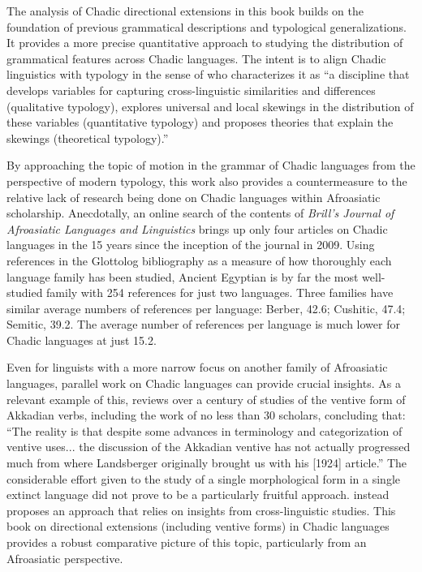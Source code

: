 The analysis of Chadic directional extensions in this book builds on the foundation of previous grammatical descriptions and typological generalizations. It provides a more precise quantitative approach to studying the distribution of grammatical features across Chadic languages. The intent is to align Chadic linguistics with typology in the sense of \citet[6]{bickelTypology21stCentury2007} who characterizes it as ``a discipline that develops variables for capturing cross-linguistic similarities and differences (qualitative typology), explores universal and local skewings in the distribution of these variables (quantitative typology) and proposes theories that explain the skewings (theoretical typology).''

By approaching the topic of motion in the grammar of Chadic languages from the perspective of modern typology, this work also provides a countermeasure to the relative lack of research being done on Chadic languages within Afroasiatic scholarship. Anecdotally, an online search of the contents of \textit{Brill's Journal of Afroasiatic Languages and Linguistics} brings up only four articles on Chadic languages in the 15 years since the inception of the journal in 2009. Using references in the Glottolog bibliography \citep{hammarstromGlottolog502024} as a measure of how thoroughly each language family has been studied, Ancient Egyptian is by far the most well-studied family with 254 references for just two languages. Three families have similar average numbers of references per language: Berber, 42.6; Cushitic, 47.4; Semitic, 39.2. The average number of references per language is much lower for Chadic languages at just 15.2.

Even for linguists with a more narrow focus on another family of Afroasiatic languages, parallel work on Chadic languages can provide crucial insights. As a relevant example of this, \citet[133]{fixSemanticsSemiticVentive2020} reviews over a century of studies of the ventive form of Akkadian verbs, including the work of no less than 30 scholars, concluding that: ``The reality is that despite some advances in terminology and categorization of ventive uses... the discussion of the Akkadian ventive has not actually progressed much from where Landsberger originally brought us with his [1924] article.'' The considerable effort given to the study of a single morphological form in a single extinct language did not prove to be a particularly fruitful approach. \citet[]{fixSemanticsSemiticVentive2020} instead proposes an approach that relies on insights from cross-linguistic studies. This book on directional extensions (including ventive forms) in Chadic languages provides a robust comparative picture of this topic, particularly from an Afroasiatic perspective. 


